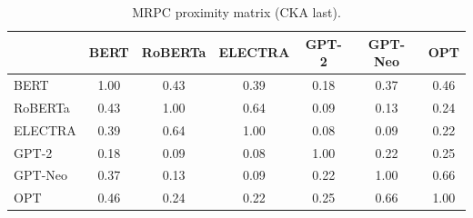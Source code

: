 \begin{table}[!ht]
\centering
\scriptsize
\setlength{\tabcolsep}{3pt}
\begin{tabular}{lcccccc}
\toprule
& \textbf{BERT} & \textbf{RoBERTa} & \textbf{ELECTRA} & \textbf{GPT-2} & \textbf{GPT-Neo} & \textbf{OPT} \\
\midrule
BERT & 1.00 & 0.43 & 0.39 & 0.18 & 0.37 & 0.46 \\
RoBERTa & 0.43 & 1.00 & 0.64 & 0.09 & 0.13 & 0.24 \\
ELECTRA & 0.39 & 0.64 & 1.00 & 0.08 & 0.09 & 0.22 \\
GPT-2 & 0.18 & 0.09 & 0.08 & 1.00 & 0.22 & 0.25 \\
GPT-Neo & 0.37 & 0.13 & 0.09 & 0.22 & 1.00 & 0.66 \\
OPT & 0.46 & 0.24 & 0.22 & 0.25 & 0.66 & 1.00 \\
\bottomrule
\end{tabular}
\caption{MRPC proximity matrix (CKA last).}
\label{tab:proximity_mrpc}
\end{table}